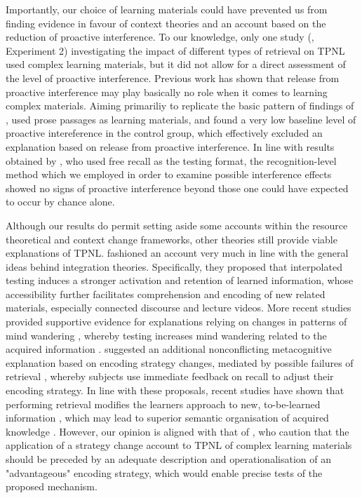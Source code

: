 \documentclass[../main.tex]{subfiles}
\begin{document}
Importantly, our choice of learning materials could have prevented us from 
finding evidence in favour of context theories and an account based on the 
reduction of proactive interference. To our knowledge, only one study 
(\citealp{divisRetrievalSpeedsContext2014}, Experiment 2) investigating the 
impact of different types of retrieval on TPNL used complex learning 
materials, but it did not allow for a direct assessment of the level of 
proactive interference. Previous work has shown that release from proactive
interference may play basically no role when it comes to learning complex
materials. Aiming primariliy to replicate the basic pattern of findings of 
\cite{szpunarTestingStudyInsulates2008}, \cite{wissmanInterimTestEffect2011} 
used prose passages as learning materials, and found a very low baseline level 
of proactive intereference in the control group, which effectively excluded
an explanation based on release from proactive interference. In line with 
results obtained by \cite{wissmanInterimTestEffect2011}, who used free recall 
as the testing format, the recognition-level method which we employed in order 
to examine possible interference effects showed no signs of proactive 
interference beyond those one could have expected to occur by chance alone.

Although our results do permit setting aside some accounts within the 
resource theoretical and context change frameworks, other theories still 
provide viable explanations of TPNL. \cite{wissmanInterimTestEffect2011} 
fashioned an account very much in line with the general ideas behind 
integration theories. Specifically, they proposed that interpolated testing 
induces a stronger activation and retention of learned information, whose 
accessibility further facilitates comprehension and encoding of new related 
materials, especially connected discourse and lecture videos. More recent 
studies provided supportive evidence for explanations relying on changes in 
patterns of mind wandering \cite{szpunarInterpolatedMemoryTests2013}, whereby 
testing increases mind wandering related to the acquired information
\cite{jingInterpolatedTestingInfluences2016}. 
\cite{wissmanInterimTestEffect2011} suggested an additional nonconflicting 
metacognitive explanation based on encoding strategy changes, mediated by 
possible failures of retrieval \citep{bahrickImportanceRetrievalFailures2005}, 
whereby subjects use immediate feedback on recall to adjust their encoding 
strategy. In line with these proposals, recent studies have shown that 
performing retrieval modifies the learners approach to new, to-be-learned 
information \citep{choTestingEnhancesBoth2017, 
soderstromTestingFacilitatesRegulation2014}, which may lead to superior 
semantic organisation of acquired knowledge 
\citep{chanTestingPotentiatesNew2018, jingInterpolatedTestingInfluences2016}. 
However, our opinion is aligned with that of 
\cite{chanTestingPotentiatesNew2018}, who caution that the application 
of a strategy change account to TPNL of complex learning materials should be 
preceded by an adequate description and operationalisation of an "advantageous"
encoding strategy, which would enable precise tests of the proposed mechanism.
\end{document}
